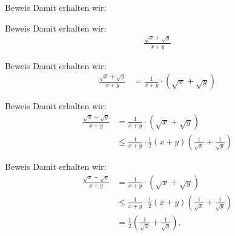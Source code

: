 \documentclass[10pt]{beamer}
\begin{document}
\begin{frame}{Beweis}
    Damit erhalten wir:
\end{frame}



\begin{frame}{Beweis}
    Damit erhalten wir:
    \begin{align*}
        \frac{\sqrt{x} + \sqrt{y}}{x + y}
    \end{align*}
\end{frame}



\begin{frame}{Beweis}
    Damit erhalten wir:
    \begin{align*}
        \frac{\sqrt{x} + \sqrt{y}}{x + y}
        & = \frac{1}{x + y} \cdot \left( \sqrt{x} + \sqrt{y} \right)
    \end{align*}
\end{frame}



\begin{frame}{Beweis}
    Damit erhalten wir:
    \begin{align*}
        \frac{\sqrt{x} + \sqrt{y}}{x + y}
        & = \frac{1}{x + y} \cdot \left( \sqrt{x} + \sqrt{y} \right) \\
        & \leq \frac{1}{x + y} \cdot \frac{1}{2}\left( x + y \right) \left( \frac{1}{\sqrt{x}} + \frac{1}{\sqrt{y}} \right)
    \end{align*}
\end{frame}



\begin{frame}{Beweis}
    Damit erhalten wir:
    \begin{align*}
        \frac{\sqrt{x} + \sqrt{y}}{x + y}
        & = \frac{1}{x + y} \cdot \left( \sqrt{x} + \sqrt{y} \right) \\
        & \leq \frac{1}{x + y} \cdot \frac{1}{2}\left( x + y \right)\left( \frac{1}{\sqrt{x}} + \frac{1}{\sqrt{y}} \right) \\
        & = \frac{1}{2}\left( \frac{1}{\sqrt{x}} + \frac{1}{\sqrt{y}} \right).
    \end{align*}
\end{frame}
\end{document}
